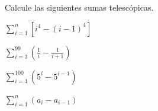 \item Calcule las siguientes sumas telescópicas.
\begin{enumerate}
    \begin{minipage}{0.45\textwidth}
    \item[(a)] $\displaystyle \sum_{i=1}^n [i^4 - (i - 1)^4]$
    \item[(c)] $\displaystyle \sum_{i=3}^{99} \left( \frac{1}{i} - \frac{1}{i+1} \right)$
    \end{minipage}%
    \begin{minipage}{0.45\textwidth}
    \item[(b)] $\displaystyle \sum_{i=1}^{100} (5^i - 5^{i-1})$
    \item[(d)] $\displaystyle \sum_{i=1}^n (a_i - a_{i-1})$
    \end{minipage}
\end{enumerate}
